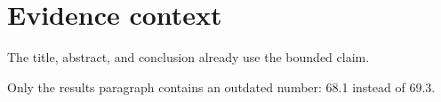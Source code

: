 \section{Evidence context}
The title, abstract, and conclusion already use the bounded claim.

Only the results paragraph contains an outdated number: 68.1 instead of 69.3.
